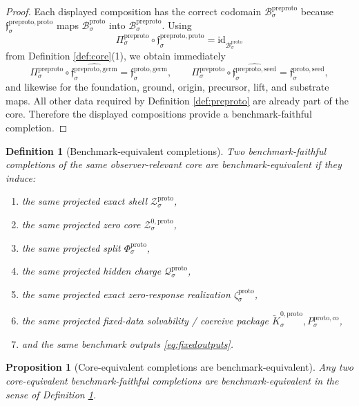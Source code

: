 \documentclass[11pt]{article}
\newcommand{\ProtoBody}[1]{\mathcal B_{#1}^{\mathrm{proto}}}
\newcommand{\ProtoGermMin}[1]{\mathfrak f_{#1}^{\mathrm{proto,germ}}}
\newcommand{\ProtoSeedMin}[1]{\mathfrak f_{#1}^{\mathrm{proto,seed}}}
\newcommand{\ProtoShellSet}[1]{\mathcal Z_{#1}^{\mathrm{proto}}}
\newcommand{\ProtoZeroCore}[1]{\mathcal Z_{#1}^{0,\mathrm{proto}}}
\newcommand{\ProtoSplit}[1]{\Phi_{#1}^{\mathrm{proto}}}
\newcommand{\ProtoCharge}[1]{\mathcal Q_{#1}^{\mathrm{proto}}}
\newcommand{\ProtoEmbed}[1]{\zeta_{#1}^{\mathrm{proto}}}
\newcommand{\ProtoKernelCh}[1]{\widetilde K_{#1}^{0,\mathrm{proto}}}
\newcommand{\ProtoStateComp}[1]{P_{#1}^{\mathrm{proto,co}}}
\newcommand{\PreProtoBody}[1]{\mathcal B_{#1}^{\mathrm{preproto}}}
\newcommand{\PreProtoProj}[1]{\Pi_{#1}^{\mathrm{preproto}}}
\newcommand{\PreProtoProtoMin}[1]{\mathfrak f_{#1}^{\mathrm{preproto,proto}}}
\newcommand{\PreProtoGermMin}[1]{\mathfrak f_{#1}^{\mathrm{preproto,germ}}}
\newcommand{\PreProtoSeedMin}[1]{\mathfrak f_{#1}^{\mathrm{preproto,seed}}}
\newtheorem{definition}{Definition}
\newtheorem{proposition}{Proposition}
\begin{document}
\begin{proof}
Each displayed composition has the correct codomain \(\PreProtoBody{\sigma}\) because \(\PreProtoProtoMin{\sigma}\) maps \(\ProtoBody{\sigma}\) into \(\PreProtoBody{\sigma}\). Using
\[
\PreProtoProj{\sigma}\circ\PreProtoProtoMin{\sigma}
=
\mathrm{id}_{\ProtoBody{\sigma}}
\]
from Definition \ref{def:core}(1), we obtain immediately
\[
\PreProtoProj{\sigma}\circ\widehat{\PreProtoGermMin{\sigma}}
=
\ProtoGermMin{\sigma},
\qquad
\PreProtoProj{\sigma}\circ\widehat{\PreProtoSeedMin{\sigma}}
=
\ProtoSeedMin{\sigma},
\]
and likewise for the foundation, ground, origin, precursor, lift, and substrate maps. All other data required by Definition \ref{def:preproto} are already part of the core. Therefore the displayed compositions provide a benchmark-faithful completion.
\end{proof}

\begin{definition}[Benchmark-equivalent completions]
\label{def:bencheq}
Two benchmark-faithful completions of the same observer-relevant core are \emph{benchmark-equivalent} if they induce:
\begin{enumerate}
    \item the same projected exact shell \(\ProtoShellSet{\sigma}\),
    \item the same projected zero core \(\ProtoZeroCore{\sigma}\),
    \item the same projected split \(\ProtoSplit{\sigma}\),
    \item the same projected hidden charge \(\ProtoCharge{\sigma}\),
    \item the same projected exact zero-response realization \(\ProtoEmbed{\sigma}\),
    \item the same projected fixed-data solvability / coercive package \(\ProtoKernelCh{\sigma},\ProtoStateComp{\sigma}\),
    \item and the same benchmark outputs \eqref{eq:fixedoutputs}.
\end{enumerate}
\end{definition}

\begin{proposition}[Core-equivalent completions are benchmark-equivalent]
\label{prop:equiv}
Any two core-equivalent benchmark-faithful completions are benchmark-equivalent in the sense of Definition \ref{def:bencheq}.
\end{proposition}
\end{document}
